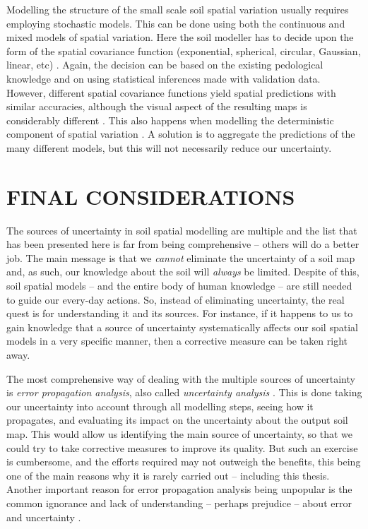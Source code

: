 Modelling the structure of the small scale soil spatial variation usually requires employing stochastic 
models. This can be done using both the continuous and mixed models of spatial variation. Here the soil 
modeller has to decide upon the form of the spatial covariance function (exponential, spherical, circular, 
Gaussian, linear, etc) \cite{WebsterEtAl2007}. Again, the decision can be based on the existing pedological 
knowledge and on using statistical inferences made with validation data. However, different spatial covariance 
functions yield spatial predictions with similar accuracies, although the visual aspect of the resulting maps 
is considerably different \cite{Lark2000a}. This also happens when modelling the deterministic component of 
spatial variation \cite{HeungEtAl2016}. A solution is to aggregate the predictions of the many different 
models, but this will not necessarily reduce our uncertainty.

\section{FINAL CONSIDERATIONS}

The sources of uncertainty in soil spatial modelling are multiple and the list that has been presented here
is far from being comprehensive -- others will do a better job. The main message is that we \emph{cannot} 
eliminate the uncertainty of a soil map and, as such, our knowledge about the soil will \emph{always} be 
limited. Despite of this, soil spatial models -- and the entire body of human knowledge -- are still needed to 
guide our every-day actions. So, instead of eliminating uncertainty, the real quest is for understanding it 
and its sources. For instance, if it happens to us to gain knowledge that a source of uncertainty 
systematically affects our soil spatial models in a very specific manner, then a corrective measure can be 
taken right away.

The most comprehensive way of dealing with the multiple sources of uncertainty is \emph{error propagation 
analysis}, also called \emph{uncertainty analysis} \cite{HeuvelinkEtAl1989, Taylor1997}. This is done taking 
our uncertainty into account through all modelling steps, seeing how it propagates, and evaluating its impact 
on the uncertainty about the output soil map. This would allow us identifying the main source of uncertainty, 
so that we could try to take corrective measures to improve its quality. But such an exercise is cumbersome, 
and the efforts required may not outweigh the benefits, this being one of the main reasons why it is rarely 
carried out \cite{HeuvelinkEtAl2006b, NelsonEtAl2011} -- including this thesis. Another important reason for 
error propagation analysis being unpopular is the common ignorance and lack of understanding -- perhaps 
prejudice -- about error and uncertainty \cite{Wechsler2003, Heuvelink2005}.

